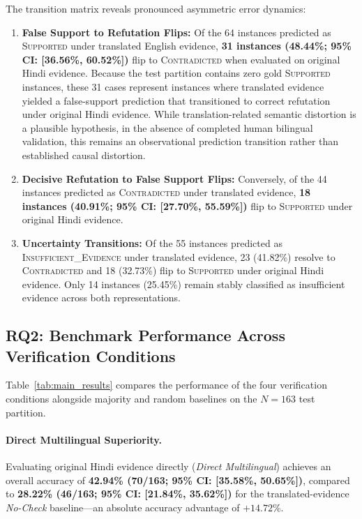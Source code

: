 The transition matrix reveals pronounced asymmetric error dynamics:
\begin{enumerate}
    \item \textbf{False Support to Refutation Flips:} Of the 64 instances predicted as \textsc{Supported} under translated English evidence, \textbf{31 instances (48.44\%; 95\% CI: [36.56\%, 60.52\%])} flip to \textsc{Contradicted} when evaluated on original Hindi evidence. Because the test partition contains zero gold \textsc{Supported} instances, these 31 cases represent instances where translated evidence yielded a false-support prediction that transitioned to correct refutation under original Hindi evidence. While translation-related semantic distortion is a plausible hypothesis, in the absence of completed human bilingual validation, this remains an observational prediction transition rather than established causal distortion.
    \item \textbf{Decisive Refutation to False Support Flips:} Conversely, of the 44 instances predicted as \textsc{Contradicted} under translated evidence, \textbf{18 instances (40.91\%; 95\% CI: [27.70\%, 55.59\%])} flip to \textsc{Supported} under original Hindi evidence.
    \item \textbf{Uncertainty Transitions:} Of the 55 instances predicted as \textsc{Insufficient\_Evidence} under translated evidence, 23 (41.82\%) resolve to \textsc{Contradicted} and 18 (32.73\%) flip to \textsc{Supported} under original Hindi evidence. Only 14 instances (25.45\%) remain stably classified as insufficient evidence across both representations.
\end{enumerate}

\subsection{RQ2: Benchmark Performance Across Verification Conditions}
Table~\ref{tab:main_results} compares the performance of the four verification conditions alongside majority and random baselines on the $N=163$ test partition.



\paragraph{Direct Multilingual Superiority.}
Evaluating original Hindi evidence directly (\emph{Direct Multilingual}) achieves an overall accuracy of \textbf{42.94\% (70/163; 95\% CI: [35.58\%, 50.65\%])}, compared to \textbf{28.22\% (46/163; 95\% CI: [21.84\%, 35.62\%])} for the translated-evidence \emph{No-Check} baseline---an absolute accuracy advantage of $+14.72\%$. 

